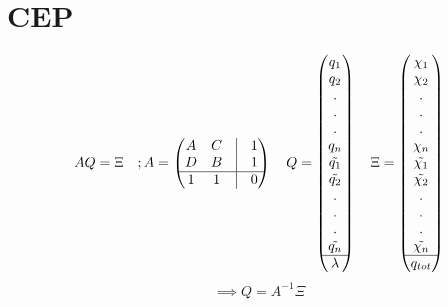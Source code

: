 \documentclass[12pt,english]{article}
\begin{document}
	\section{CEP}
	\begin{equation}
	A Q = \Xi\hspace{10pt} ; 
	A = 
	\begin{pmatrix}
		A & C & \vline & 1\\
		D & B & \vline & 1\\
		\hline
		1 & 1 & \vline & 0
	\end{pmatrix}
	\hspace{10pt}
	Q = 
	\begin{pmatrix}
		q_1 \\ q_2 \\ .\\.\\.\\q_n\\\tilde{q_1}\\\tilde{q_2}\\.\\.\\.\\\tilde{q_n}\\\hline\lambda
	\end{pmatrix}
	\hspace{10pt}
	\Xi = 
	\begin{pmatrix}
	\chi_1 \\ \chi_2 \\ .\\.\\.\\\chi_n\\\tilde{\chi_1}\\\tilde{\chi_2}\\.\\.\\.\\\tilde{\chi_n}\\\hline q_{tot}
	\end{pmatrix}
	\end{equation}
	\begin{equation}
		\implies
		Q = A^{-1}\Xi
	\end{equation}
	
\end{document}
